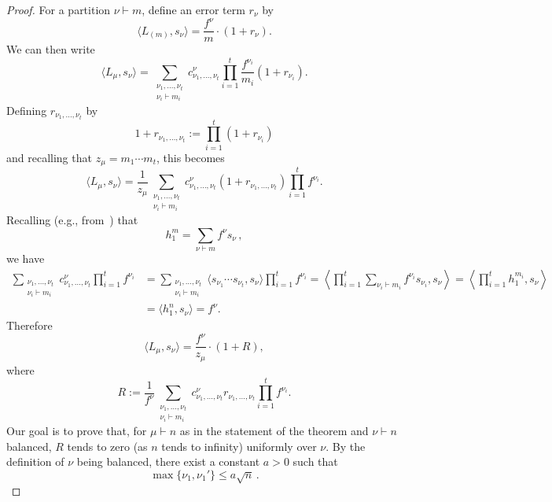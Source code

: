 \documentclass[12pt]%
{amsart}
\theoremstyle{plain}
\theoremstyle{definition}
\theoremstyle{remark}
\begin{document}
\begin{proof}
For a partition $\nu \vdash m$, define an error term $r_\nu$ by
\begin{equation}\label{eq:def_error}
    \langle L_{(m)},s_\nu \rangle
    = \frac{f^\nu}{m} \cdot (1 + r_\nu) .
\end{equation}
We can then write
\[
    \langle L_\mu,s_\nu \rangle
    = \sum_{\substack{\nu_1,\ldots,\nu_t \\ \nu_i \vdash m_i}} c^\nu_{\nu_1,\ldots,\nu_t} \prod_{i=1}^t \frac{f^{\nu_i}}{m_i} (1 + r_{\nu_i}) .
\]
Defining $r_{\nu_1, \dots, \nu_t}$ by
\[
    1 + r_{\nu_1, \dots, \nu_t} 
    := \prod_{i=1}^{t} (1 + r_{\nu_i}) 
\]
and recalling that $z_\mu  = m_1 \cdots m_t$,
this becomes
\[
    \langle L_\mu,s_\nu \rangle
    = \frac{1}{z_\mu} \sum_{\substack{\nu_1,\ldots,\nu_t \\ \nu_i \vdash m_i}} c^\nu_{\nu_1,\ldots,\nu_t} (1 + r_{\nu_1, \dots, \nu_t}) \prod_{i=1}^t f^{\nu_i} .
\]
Recalling (e.g., from~\cite[Corollary 7.12.5]{Stanley_ECII}) that
\[
    h_1^m = \sum_{\nu \vdash m} f^\nu s_\nu \,,
\]
we have
\begin{align*}
    \sum_{\substack{\nu_1,\ldots,\nu_t \\ \nu_i \vdash m_i}} c^\nu_{\nu_1,\ldots,\nu_t} \prod_{i=1}^t f^{\nu_i} 
    &= \sum_{\substack{\nu_1,\ldots,\nu_t \\ \nu_i \vdash m_i}} \langle s_{\nu_1} \cdots s_{\nu_t}, s_\nu \rangle \prod_{i=1}^t f^{\nu_i} 
    = \left\langle \prod_{i=1}^t \sum_{\nu_i \vdash m_i} f^{\nu_i} s_{\nu_i}, s_\nu \right\rangle 
    = \left\langle \prod_{i=1}^t h_1^{m_i}, s_\nu \right\rangle \\
    &= \langle h_1^n, s_\nu \rangle
    = f^\nu .
\end{align*}
Therefore
\[
    \langle L_\mu,s_\nu \rangle
    = \frac{f^\nu}{z_\mu} \cdot (1 + R) ,
\]
where
\begin{equation}\label{eq:total_error}
    R
    := \frac{1}{f^\nu} \sum_{\substack{\nu_1,\ldots,\nu_t \\ \nu_i \vdash m_i}} c^\nu_{\nu_1,\ldots,\nu_t} r_{\nu_1, \dots, \nu_t} \prod_{i=1}^t f^{\nu_i} .
\end{equation}
Our goal is to prove that, 
for $\mu \vdash n$ 
as in the statement of the theorem and $\nu \vdash n$ balanced, 
$R$ tends to zero (as $n$ tends to infinity)
uniformly over $\nu$.
By the definition of $\nu$ being balanced, there exist a constant $a>0$ such that
\begin{equation}\label{eq:balanced}
    \max\{\nu_1,\nu_1'\}\le a\sqrt n\,.   
\end{equation}


\end{proof}
\end{document}
